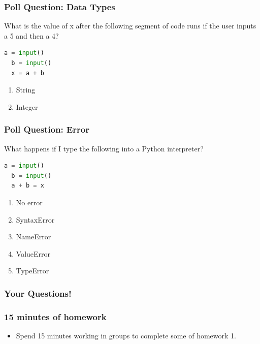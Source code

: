 \documentclass{beamer}
\begin{document}
%
%
%
\begin{frame}[fragile]
  \frametitle{Poll Question: Data Types}
  What is the value of x after the following segment of code runs if the user inputs a 5 and then a 4?
  \begin{lstlisting}[language=Python]
  a = input()
  b = input()
  x = a + b\end{lstlisting}
  \begin{enumerate}[A]
    \item String
    \item Integer
  \end{enumerate}
\end{frame}

%
%
%
\begin{frame}[fragile]
  \frametitle{Poll Question: Error}
  What happens if I type the following into a Python interpreter?
  \begin{lstlisting}[language=Python]
  a = input()
  b = input()
  a + b = x \end{lstlisting}
  \begin{enumerate}
    \item No error
    \item SyntaxError
    \item NameError
    \item ValueError
    \item TypeError
  \end{enumerate}
\end{frame}

\begin{frame}
  \frametitle{Your Questions!}
\end{frame}

\begin{frame}
  \frametitle{15 minutes of homework}
  \begin{itemize}
    \item Spend 15 minutes working in groups to complete some of homework 1.
  \end{itemize}
\end{frame}
\end{document}
